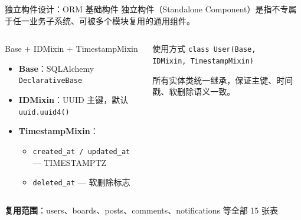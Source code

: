 \documentclass[aspectratio=169,UTF8]{ctexbeamer}
\begin{document}
\begin{frame}{独立构件设计：ORM 基础构件}
    \small
    独立构件（Standalone Component）是指不专属于任一业务子系统、可被多个模块复用的通用组件。
    \vspace{0.1cm}
    
    \begin{columns}[T]
        \begin{block}{Base + IDMixin + TimestampMixin}
            \begin{itemize}
                \item \textbf{Base}：SQLAlchemy \texttt{DeclarativeBase}
                \item \textbf{IDMixin}：UUID 主键，默认 \texttt{uuid.uuid4()}
                \item \textbf{TimestampMixin}：
                \begin{itemize}
                    \small
                    \item \texttt{created\_at / updated\_at} — TIMESTAMPTZ
                    \item \texttt{deleted\_at} — 软删除标志
                \end{itemize}
            \end{itemize}
        \end{block}
        \begin{exampleblock}{使用方式}
            \small
            \texttt{class User(Base,\\ IDMixin, TimestampMixin)}
            \vspace{0.1cm}

            所有实体类统一继承，保证主键、时间戳、软删除语义一致。
        \end{exampleblock}
    \end{columns}
    \vspace{0.1cm}
    {\footnotesize\textbf{复用范围}：users、boards、posts、comments、notifications 等全部 15 张表}
\end{frame}
\end{document}
